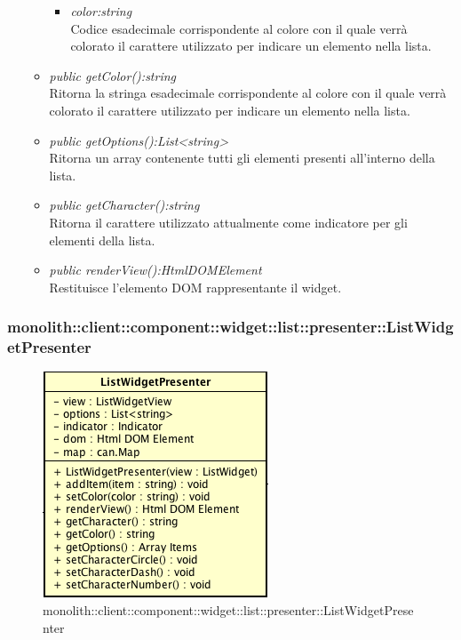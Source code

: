 \begin{itemize}
\begin{itemize}
\begin{itemize}
		\item \textit{color:string}\\
		Codice esadecimale corrispondente al colore con il quale verrà colorato il carattere utilizzato per indicare un elemento nella lista.
		\end{itemize} 
	\item \textit{public getColor():string}\\
	Ritorna la stringa esadecimale corrispondente al colore con il quale verrà colorato il carattere utilizzato per indicare un elemento nella lista.
	\item \textit{public getOptions():List<string>}\\
	Ritorna un array contenente tutti gli elementi presenti all'interno della lista.
	\item \textit{public getCharacter():string}\\
	Ritorna il carattere utilizzato attualmente come indicatore per gli elementi della lista.
	\item \textit{public renderView():HtmlDOMElement}\\
	Restituisce l'elemento DOM rappresentante il widget.
	\end{itemize}
\end{itemize}

\subsubsection{monolith::client::component::widget::list::presenter::ListWidgetPresenter}

\label{monolith::client::component::widget::list::presenter::ListWidgetPresenter}
\begin{figure}[H]
	\centering
	\includegraphics[scale=0.5]{Sezioni/SottosezioniST/img/ListWidgetPresenter.png}
	\caption{monolith::client::component::widget::list::presenter::ListWidgetPresenter}
\end{figure}

